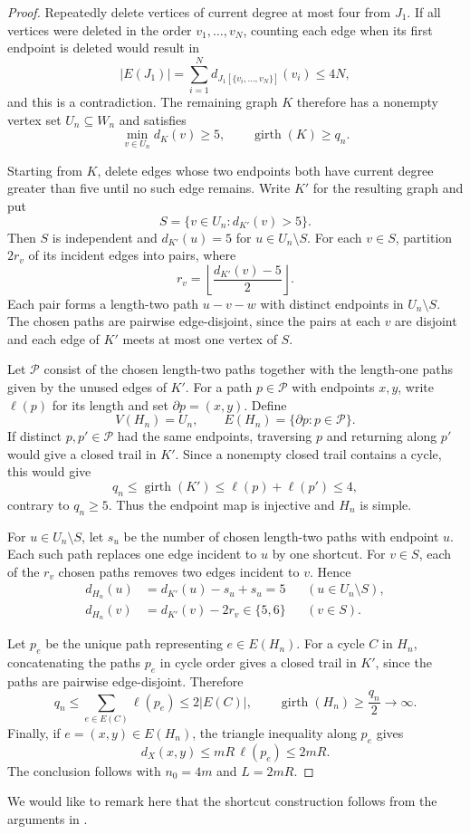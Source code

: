 \documentclass[11pt,a4paper]{article}
\theoremstyle{definition}\newtheorem{definition}[theorem]{Definition}
\theoremstyle{remark}\newtheorem{remark}[theorem]{Remark}
\begin{document}
\begin{proof}
Repeatedly delete vertices of current degree at most four from
$J_1$. If all vertices were deleted in the order $v_1,\ldots,v_N$,
counting each edge when its first endpoint is deleted would result in
$$
|E(J_1)|
=\sum_{i=1}^{N}d_{J_1[\{v_i,\ldots,v_N\}]}(v_i)
\le 4N,
$$
and this is a contradiction. The remaining graph $K$ therefore has a nonempty
vertex set $U_n\subseteq W_n$ and satisfies
$$
\min_{v\in U_n}d_K(v)\ge 5,\qquad
\operatorname{girth}(K)\ge q_n.
$$


Starting from $K$, delete edges whose two endpoints both have
current degree greater than five until no such edge remains.
Write $K'$ for the resulting graph and put
$$
S=\{v\in U_n:d_{K'}(v)>5\}.
$$
Then $S$ is independent and $d_{K'}(u)=5$ for $u\in U_n\setminus S$.
For each $v\in S$, partition $2r_v$ of its incident edges into pairs,
where
$$
r_v=\left\lfloor\frac{d_{K'}(v)-5}{2}\right\rfloor.
$$
Each pair forms a length-two path $u-v-w$ with distinct endpoints
in $U_n\setminus S$. The chosen paths are pairwise edge-disjoint,
since the pairs at each $v$ are disjoint and each edge of $K'$
meets at most one vertex of $S$.

Let $\mathcal P$ consist of the chosen length-two paths together
with the length-one paths given by the unused edges of $K'$.
For a path $p\in\mathcal P$ with endpoints $x,y$, write $\ell(p)$
for its length and set $\partial p=(x,y)$. Define
$$
V(H_n)=U_n,\qquad E(H_n)=\{\partial p:p\in\mathcal P\}.
$$
If distinct $p,p'\in\mathcal P$ had the same endpoints, traversing
$p$ and returning along $p'$ would give a closed trail in $K'$.
Since a nonempty closed trail contains a cycle, this would give
$$
q_n\le \operatorname{girth}(K')
\le \ell(p)+\ell(p')\le 4,
$$
contrary to $q_n\ge 5$. Thus the endpoint map is injective and
$H_n$ is simple.

For $u\in U_n\setminus S$, let $s_u$ be the number of chosen
length-two paths with endpoint $u$. Each such path replaces one
edge incident to $u$ by one shortcut. For $v\in S$, each of the
$r_v$ chosen paths removes two edges incident to $v$. Hence
$$
\begin{aligned}
d_{H_n}(u)&=d_{K'}(u)-s_u+s_u=5
&& (u\in U_n\setminus S),\\
d_{H_n}(v)&=d_{K'}(v)-2r_v\in\{5,6\}
&& (v\in S).
\end{aligned}
$$

Let $p_e$ be the unique path representing $e\in E(H_n)$.
For a cycle $C$ in $H_n$, concatenating the paths $p_e$ in cycle
order gives a closed trail in $K'$, since the paths are pairwise
edge-disjoint. Therefore
$$
q_n\le \sum_{e\in E(C)}\ell(p_e)\le 2|E(C)|,
\qquad
\operatorname{girth}(H_n)\ge \frac{q_n}{2}\longrightarrow\infty.
$$
Finally, if $e=(x,y)\in E(H_n)$, the triangle inequality along
$p_e$ gives
$$
d_X(x,y)\le mR\,\ell(p_e)\le 2mR.
$$
The conclusion follows with $n_0=4m$ and $L=2mR$.
\end{proof}
We would like to remark here that the shortcut construction follows from the arguments in \cite[Lemma~14]{Kun}.
\end{document}
